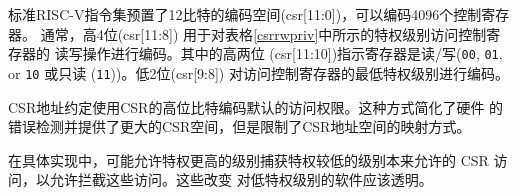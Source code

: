 
标准RISC-V指令集预置了12比特的编码空间(csr[11:0])，可以编码4096个控制寄存器。
通常，高4位(csr[11:8]) 用于对表格\ref{csrrwpriv}中所示的特权级别访问控制寄存器的
读写操作进行编码。其中的高两位 (csr[11:10])指示寄存器是读/写({\tt 00}, {\tt 01}, or {\tt 10}
或只读 ({\tt 11}))。低2位(csr[9:8]) 对访问控制寄存器的最低特权级别进行编码。


\begin{commentary}

CSR地址约定使用CSR的高位比特编码默认的访问权限。这种方式简化了硬件
的错误检测并提供了更大的CSR空间，但是限制了CSR地址空间的映射方式。


在具体实现中，可能允许特权更高的级别捕获特权较低的级别本来允许的 CSR 访问，以允许拦截这些访问。这些改变
对低特权级别的软件应该透明。

\end{commentary}

